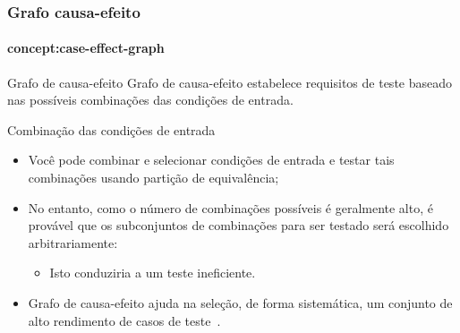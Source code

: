 \begin{frame}[parent={concept:functional-testing}, hasprev=false, hasnext=true]
\frametitle{Grafo causa-efeito}
\framesubtitle{concept:case-effect-graph}

\begin{block:concept}{Grafo de causa-efeito}
Grafo de causa-efeito estabelece requisitos de teste baseado nas possíveis
combinações das condições de entrada.
\end{block:concept}


\begin{block:fact}{Combinação das condições de entrada}
\begin{itemize}
	\item Você pode combinar e selecionar condições de entrada e testar tais
	combinações usando partição de equivalência;

	\item No entanto, como o número de combinações possíveis é geralmente alto,
	é provável que os subconjuntos de combinações para ser testado será escolhido
	arbitrariamente:
	\begin{itemize}
		\item Isto conduziria a um teste ineficiente.
	\end{itemize}

	\item Grafo de causa-efeito ajuda na seleção, de forma sistemática,
	um conjunto de alto rendimento de casos de teste~\cite[p. 66]{myers:2004}.
\end{itemize}
\end{block:fact}
\end{frame}


